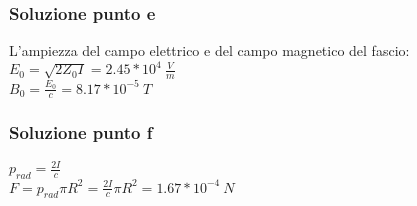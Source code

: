 \documentclass[../../main.tex]{subfiles}
\begin{document}
\subsubsection*{Soluzione punto e}
L'ampiezza del campo elettrico e del campo magnetico del fascio:\\
$E_0 = \sqrt{2 Z_0 I} = 2.45 * 10^4\ \frac{V}{m}$\\
$B_0 = \frac{E_0}{c} = 8.17 * 10^{-5}\ T$\\
\subsubsection*{Soluzione punto f}
$p_{rad} = \frac{2I}{c}$\\
$F = p_{rad} \pi R^2 = \frac{2I}{c} \pi R^2 = 1.67 * 10^{-4}\ N$
\newpage
\end{document}
